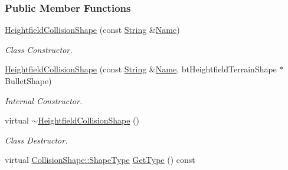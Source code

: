 \subsubsection*{Public Member Functions}
\begin{DoxyCompactItemize}
\item 
\hyperlink{classMezzanine_1_1HeightfieldCollisionShape_aee6afa08c9007498cc0693b8bfb2da95}{HeightfieldCollisionShape} (const \hyperlink{namespaceMezzanine_acf9fcc130e6ebf08e3d8491aebcf1c86}{String} \&\hyperlink{classMezzanine_1_1CollisionShape_aac524c5c56fa4d158bc071f8aecfbe79}{Name})
\begin{DoxyCompactList}\small\item\em Class Constructor. \item\end{DoxyCompactList}\item 
\hyperlink{classMezzanine_1_1HeightfieldCollisionShape_a79b5e672a6bded0e2f38587b901247ab}{HeightfieldCollisionShape} (const \hyperlink{namespaceMezzanine_acf9fcc130e6ebf08e3d8491aebcf1c86}{String} \&\hyperlink{classMezzanine_1_1CollisionShape_aac524c5c56fa4d158bc071f8aecfbe79}{Name}, btHeightfieldTerrainShape $\ast$BulletShape)
\begin{DoxyCompactList}\small\item\em Internal Constructor. \item\end{DoxyCompactList}\item 
\hypertarget{classMezzanine_1_1HeightfieldCollisionShape_ac9521af83a3d96d3f2c71c5a8a39b09d}{
virtual \hyperlink{classMezzanine_1_1HeightfieldCollisionShape_ac9521af83a3d96d3f2c71c5a8a39b09d}{$\sim$HeightfieldCollisionShape} ()}
\label{classMezzanine_1_1HeightfieldCollisionShape_ac9521af83a3d96d3f2c71c5a8a39b09d}

\begin{DoxyCompactList}\small\item\em Class Destructor. \item\end{DoxyCompactList}\item 
virtual \hyperlink{classMezzanine_1_1CollisionShape_ad04186055565998879b64176d6dd100d}{CollisionShape::ShapeType} \hyperlink{classMezzanine_1_1HeightfieldCollisionShape_af27ffaf88fc12af6ddc89704e60ecd33}{GetType} () const 
\end{DoxyCompactItemize}
